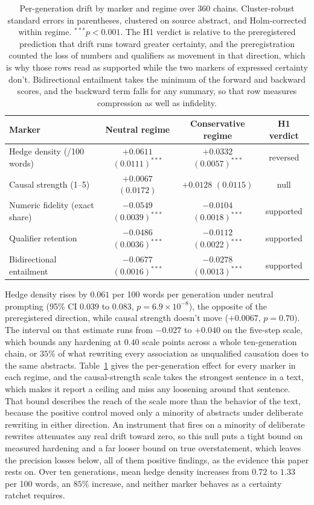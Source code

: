 \documentclass{article}
\begin{document}
\begin{table}[t]
\caption{Per-generation drift by marker and regime over 360 chains. Cluster-robust standard errors in parentheses, clustered on source abstract, and Holm-corrected within regime. $^{***}p < 0.001$. The H1 verdict is relative to the preregistered prediction that drift runs toward greater certainty, and the preregistration counted the loss of numbers and qualifiers as movement in that direction, which is why those rows read as supported while the two markers of expressed certainty don't. Bidirectional entailment takes the minimum of the forward and backward scores, and the backward term falls for any summary, so that row measures compression as well as infidelity.}
\label{tab:h1}
\centering
\begin{tabular}{lccc}
\toprule
Marker & Neutral regime & Conservative regime & H1 verdict \\
\midrule
Hedge density (/100 words) & $+0.0611$ $(0.0111)^{***}$ & $+0.0332$ $(0.0057)^{***}$ & reversed \\
Causal strength (1--5) & $+0.0067$ $(0.0172)$ & $+0.0128$ $(0.0115)$ & null \\
Numeric fidelity (exact share) & $-0.0549$ $(0.0039)^{***}$ & $-0.0104$ $(0.0018)^{***}$ & supported \\
Qualifier retention & $-0.0486$ $(0.0036)^{***}$ & $-0.0112$ $(0.0022)^{***}$ & supported \\
Bidirectional entailment & $-0.0677$ $(0.0016)^{***}$ & $-0.0278$ $(0.0013)^{***}$ & supported \\
\bottomrule
\end{tabular}
\end{table}

Hedge density rises by $0.061$ per 100 words per generation under neutral prompting (95\% CI $0.039$ to $0.083$, $p = 6.9 \times 10^{-8}$), the opposite of the preregistered direction, while causal strength doesn't move ($+0.0067$, $p = 0.70$). The interval on that estimate runs from $-0.027$ to $+0.040$ on the five-step scale, which bounds any hardening at $0.40$ scale points across a whole ten-generation chain, or $35\%$ of what rewriting every association as unqualified causation does to the same abstracts. Table~\ref{tab:h1} gives the per-generation effect for every marker in each regime, and the causal-strength scale takes the strongest sentence in a text, which makes it report a ceiling and miss any loosening around that sentence. That bound describes the reach of the scale more than the behavior of the text, because the positive control moved only a minority of abstracts under deliberate rewriting in either direction. An instrument that fires on a minority of deliberate rewrites attenuates any real drift toward zero, so this null puts a tight bound on measured hardening and a far looser bound on true overstatement, which leaves the precision losses below, all of them positive findings, as the evidence this paper rests on. Over ten generations, mean hedge density increases from $0.72$ to $1.33$ per 100 words, an $85\%$ increase, and neither marker behaves as a certainty ratchet requires.
\end{document}
